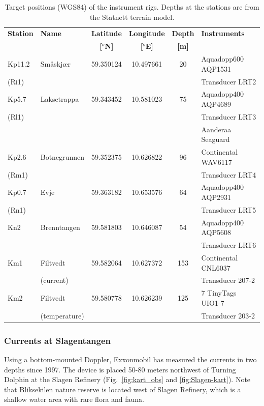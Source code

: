 \begin{table}[ht] 
\caption{Target positions (WGS84) of the instrument rigs. Depths at the stations are from the Statnett terrain model.} 
\label{tab:Statnett} 
\centering 
\begin{tabular}{|llcccl|} 
\hline  
{\bf Station} & {\bf Name} & {\bf Latitude} & {\bf Longitude} & {\bf Depth} & {\bf Instruments} \\ 
&& {\bf [$^o$N]} & {\bf [$^o$E]} & {\bf [m]} & \\ \hline
Kp11.2 & Sm\aa skj\ae r & 59.350124 & 10.497661 & 20 & Aquadopp600 AQP1531 \\
(Ri1) &&&&& Transducer LRT2 \\ \hline
Kp5.7 & Laksetrappa & 59.343452 & 10.581023 & 75 & Aquadopp400 AQP4689 \\
(Rl1) &&&&& Transducer LRT3 \\
      &&&&& Aanderaa Seaguard \\  \hline
Kp2.6 & Botnegrunnen & 59.352375 & 10.626822 & 96 & Continental WAV6117 \\
(Rm1) &&&&& Transducer LRT4 \\ \hline
Kp0.7 & Evje & 59.363182 & 10.653576 & 64 & Aquadopp400 AQP2931 \\
(Rn1) &&&&& Transducer LRT5 \\ \hline
Kn2 & Brenntangen & 59.581803 & 10.646087 & 54 & Aquadopp400 AQP5608 \\
      &&&&& Transducer LRT6 \\ \hline
Km1 & Filtvedt & 59.582064 & 10.627372 & 153 & Continental CNL6037 \\
      & (current) &&&& Transducer 207-2 \\ \hline
Km2 & Filtvedt & 59.580778 & 10.626239 & 125 & 7 TinyTags UIO1-7 \\
      & (temperature) &&&& Transducer 203-2 \\
\hline
\end{tabular}
\end{table}

\clearpage

\subsubsection{Currents at Slagentangen}
Using a bottom-mounted Doppler, Exxonmobil has measured the currents in two depths since 1997. The device is placed 50-80 meters northwest of Turning Dolphin at the Slagen Refinery (Fig.~\ref{fig:kart_obs} and \ref{fig:Slagen-kart}). Note that Bliksekilen nature reserve is located west of Slagen Refinery, which is a shallow water area with rare flora and fauna. 

